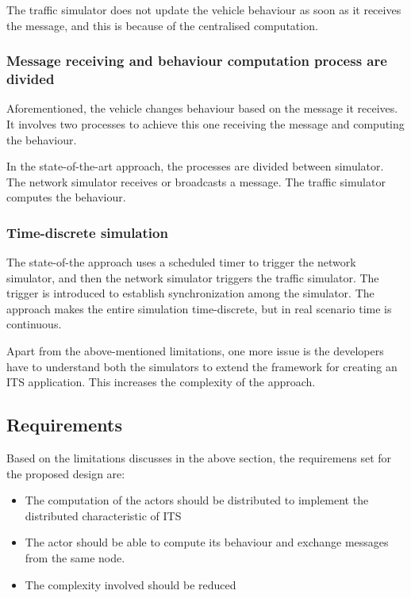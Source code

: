 The traffic simulator does not update the vehicle behaviour as soon as it receives the message, and this is because of the centralised computation.

\subsubsection{Message receiving and behaviour computation process are divided}
Aforementioned, the vehicle changes behaviour based on the message it receives. It involves two processes to achieve this one receiving the message and computing the behaviour.

In the state-of-the-art approach, the processes are divided between simulator. The network simulator receives or broadcasts a message. The traffic simulator computes the behaviour. 

\subsubsection{Time-discrete simulation}
The state-of-the approach uses a scheduled timer to trigger the network simulator, and then the network simulator triggers the traffic simulator. The trigger is introduced to establish synchronization among the simulator. The approach makes the entire simulation time-discrete, but in real scenario time is continuous.

Apart from the above-mentioned limitations, one more issue is the developers have to understand both the simulators to extend the framework for creating an ITS application. This increases the complexity of the approach.

\subsection{Requirements}
Based on the limitations discusses in the above section, the requiremens set for the proposed design are:

\begin{itemize}
    \item The computation of the actors should be distributed to implement the distributed characteristic of ITS 

 \item The actor should be able to compute its behaviour and exchange messages from the same node. 

 \item The complexity involved should be reduced
\end{itemize}


